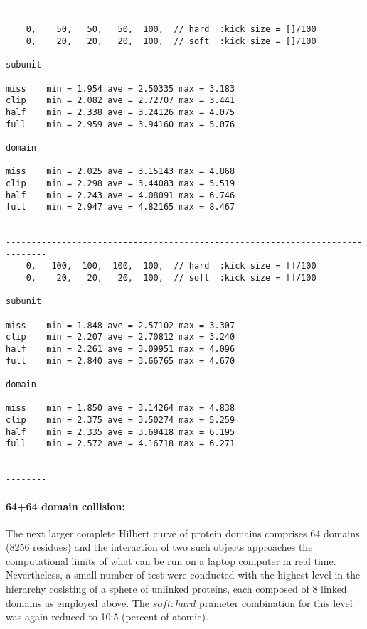 \begin{singlespace}
\begin{verbatim}
------------------------------------------------------------------------------
    0,    50,   50,   50,  100,  // hard  :kick size = []/100
    0,    20,   20,   20,  100,  // soft  :kick size = []/100

subunit

miss	min = 1.954 ave = 2.50335 max = 3.183
clip	min = 2.082 ave = 2.72707 max = 3.441
half	min = 2.338 ave = 3.24126 max = 4.075
full	min = 2.959 ave = 3.94160 max = 5.076

domain

miss	min = 2.025 ave = 3.15143 max = 4.868
clip	min = 2.298 ave = 3.44083 max = 5.519
half	min = 2.243 ave = 4.08091 max = 6.746
full	min = 2.947 ave = 4.82165 max = 8.467


------------------------------------------------------------------------------
    0,   100,  100,  100,  100,  // hard  :kick size = []/100
    0,    20,   20,   20,  100,  // soft  :kick size = []/100

subunit

miss	min = 1.848 ave = 2.57102 max = 3.307
clip	min = 2.207 ave = 2.70812 max = 3.240
half	min = 2.261 ave = 3.09951 max = 4.096
full	min = 2.840 ave = 3.66765 max = 4.670

domain

miss	min = 1.850 ave = 3.14264 max = 4.838
clip	min = 2.375 ave = 3.50274 max = 5.259
half	min = 2.335 ave = 3.69418 max = 6.195
full	min = 2.572 ave = 4.16718 max = 6.271

------------------------------------------------------------------------------
\end{verbatim}
\end{singlespace}

\paragraph{64+64 domain collision:\\}

The next larger complete Hilbert curve of protein domains comprises 64 domains (8256 residues)
and the interaction of two such objects approaches the computational limits of what can be run
on a laptop computer in real time.   Nevertheless, a small number of test were conducted
with the highest level in the hierarchy cosisting of a sphere of unlinked proteins,
each composed of 8 linked domains as employed above.    The $soft:hard$ prameter combination
for this level was again reduced to 10:5 (percent of atomic).

